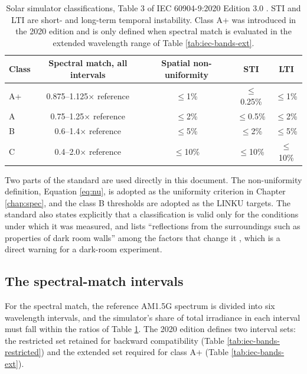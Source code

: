 \begin{table}[!ht]
\centering
\small
\caption[IEC 60904-9:2020 solar simulator classifications]{Solar simulator classifications, Table 3 of IEC 60904-9:2020 Edition 3.0 \cite{iec60904_9_2020}. STI and LTI are short- and long-term temporal instability. Class A+ was introduced in the 2020 edition and is only defined when spectral match is evaluated in the extended wavelength range of Table \ref{tab:iec-bands-ext}.}
\label{tab:iec-classes}
\begin{tabular}{lcccc}
\toprule
\textbf{Class} & \textbf{Spectral match, all intervals} & \textbf{Spatial non-uniformity} & \textbf{STI} & \textbf{LTI} \\
\midrule
A+  & 0.875--1.125$\times$ reference & $\leq$1\%  & $\leq$0.25\% & $\leq$1\% \\
A   & 0.75--1.25$\times$ reference   & $\leq$2\%  & $\leq$0.5\%  & $\leq$2\% \\
B   & 0.6--1.4$\times$ reference     & $\leq$5\%  & $\leq$2\%    & $\leq$5\% \\
C   & 0.4--2.0$\times$ reference     & $\leq$10\% & $\leq$10\%   & $\leq$10\% \\
\bottomrule
\end{tabular}
\end{table}

Two parts of the standard are used directly in this document. The non-uniformity definition, Equation \ref{eq:nu}, is adopted as the uniformity criterion in Chapter \ref{chap:spec}, and the class B thresholds are adopted as the LINKU targets. The standard also states explicitly that a classification is valid only for the conditions under which it was measured, and lists ``reflections from the surroundings such as properties of dark room walls'' among the factors that change it \cite{iec60904_9_2020}, which is a direct warning for a dark-room experiment.

\subsection{The spectral-match intervals}

For the spectral match, the reference AM1.5G spectrum is divided into six wavelength intervals, and the simulator's share of total irradiance in each interval must fall within the ratios of Table \ref{tab:iec-classes}. The 2020 edition defines two interval sets: the restricted set retained for backward compatibility (Table \ref{tab:iec-bands-restricted}) and the extended set required for class A+ (Table \ref{tab:iec-bands-ext}).


